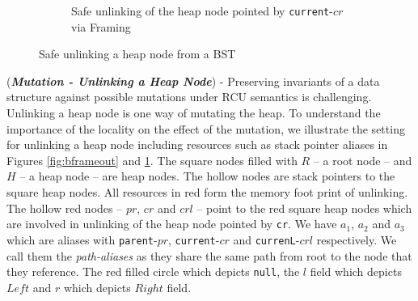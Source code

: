 \begin{figure}[H]
\begin{subfigure}[b]{.4\linewidth}

 \caption{Safe unlinking of the heap node pointed by \texttt{current}-$cr$ via \textsf{Framing}}
 \label{fig:bunlinkframeout}
\end{subfigure}
\caption{Safe unlinking a heap node from a \textsf{BST}}
 \label{fig:unlkappndx}\vspace{-2mm}
 \end{figure}

(\textit{\textbf{Mutation - Unlinking a Heap Node}}) - Preserving invariants of a data structure against possible mutations under \textsf{RCU} semantics is challenging. Unlinking a heap node is one way of mutating the heap. To understand the importance of the locality on the effect of the mutation, we illustrate the setting for unlinking a heap node including resources such as stack pointer aliases in Figures  \ref{fig:bframeout} and \ref{fig:bunlinkframeout}. The square nodes filled with $R$ -- a root node -- and $H$ -- a heap node -- are heap nodes. The hollow nodes are stack pointers to the square heap nodes. All resources in red form the memory foot print of unlinking. The hollow red nodes -- $pr$, $cr$ and $crl$ -- point to the red square heap nodes which are involved in unlinking of the heap node pointed by \texttt{cr}. We have $a_1$, $a_2$ and $a_3$ which are aliases with \texttt{parent}-$pr$, \texttt{current}-$cr$ and \texttt{currenL}-$crl$ respectively. We call them the \textit{path-aliases} as they share the same path from root to the node that they reference. The red filled circle which depicts \texttt{null}, the $l$ field which depicts $Left$ and $r$ which depicts $Right$ field.


